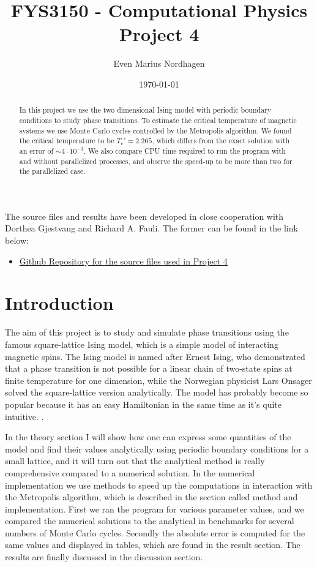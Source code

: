 \documentclass[norsk,a4paper,12pt]{article}
\title{FYS3150 - Computational Physics\\\vspace{2mm} \Large{Project 4}}
\author{\large Even Marius Nordhagen}
\date{\today}
\begin{document}
\maketitle
\begin{abstract}
In this project we use the two dimensional Ising model with periodic boundary conditions to study phase transitions. To estimate the critical temperature of magnetic systems we use Monte Carlo cycles controlled by the Metropolis algorithm. We found the critical temperature to be $T_c'=2.265$, which differs from the exact solution with an error of $\sim4\cdot10^{-3}$. We also compare CPU time required to run the program with and without parallelized processes, and observe the speed-up to be more than two for the parallelized case.
\end{abstract}
The source files and results have been developed in close cooperation with Dorthea Gjestvang and Richard A. Fauli. The former can be found in the link below:
\begin{itemize}
\item \href{https://github.com/richaraf/Comphys_projects/tree/master/Project_4}{Github Repository for the source files used in Project 4$\quad$}\cite{Repository}
\end{itemize}


\section{Introduction}
The aim of this project is to study and simulate phase transitions using the famous square-lattice Ising model, which is a simple model of interacting magnetic spins. The Ising model is named after Ernest Ising, who demonstrated that a phase transition is not possible for a linear chain of two-state spins at finite temperature for one dimension, while the Norwegian physicist Lars Onsager solved the square-lattice version analytically. The model has probably become so popular because it has an easy Hamiltonian in the same time as it's quite intuitive. \cite{Ising}.\par 
In the theory section I will show how one can express some quantities of the model and find their values analytically using periodic boundary conditions for a small lattice, and it will turn out that the analytical method is really comprehensive compared to a numerical solution. In the numerical implementation we use methods to speed up the computations in interaction with the Metropolis algorithm, which is described in the section called method and implementation. First we ran the program for various parameter values, and we compared the numerical solutions to the analytical in benchmarks for several numbers of Monte Carlo cycles. Secondly the absolute error is computed for the same values and displayed in tables, which are found in the result section. The results are finally discussed in the discussion section.
\end{document}
